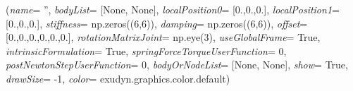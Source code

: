 %
\begin{flushleft}
\label{sec:mainsystemextensions:CreateRigidBodySpringDamper}
({\it name}= '', {\it bodyList}= [None, None], {\it localPosition0}= [0.,0.,0.], {\it localPosition1}= [0.,0.,0.], {\it stiffness}= np.zeros((6,6)), {\it damping}= np.zeros((6,6)), {\it offset}= [0.,0.,0.,0.,0.,0.], {\it rotationMatrixJoint}= np.eye(3), {\it useGlobalFrame}= True, {\it intrinsicFormulation}= True, {\it springForceTorqueUserFunction}= 0, {\it postNewtonStepUserFunction}= 0, {\it bodyOrNodeList}= [None, None], {\it show}= True, {\it drawSize}= -1, {\it color}= exudyn.graphics.color.default)
\end{flushleft}
\setlength{\itemindent}{0.7cm}
